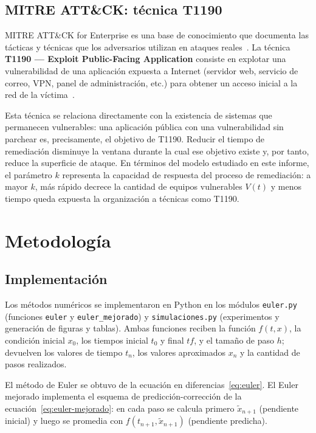 \documentclass[11pt,a4paper]{article}
\begin{document}
\subsection{MITRE ATT\&CK: técnica T1190}
\label{sec:marco-t1190}

MITRE ATT\&CK for Enterprise es una base de conocimiento que documenta las
tácticas y técnicas que los adversarios utilizan en ataques reales~\cite{mitre}.
La técnica \textbf{T1190 --- Exploit Public-Facing Application} consiste en
explotar una vulnerabilidad de una aplicación expuesta a Internet (servidor
web, servicio de correo, VPN, panel de administración, etc.) para obtener un
acceso inicial a la red de la víctima~\cite{t1190}.

Esta técnica se relaciona directamente con la existencia de sistemas que
permanecen vulnerables: una aplicación pública con una vulnerabilidad sin
parchear es, precisamente, el objetivo de T1190. Reducir el tiempo de
remediación disminuye la ventana durante la cual ese objetivo existe y, por
tanto, reduce la superficie de ataque. En términos del modelo estudiado en
este informe, el parámetro $k$ representa la capacidad de respuesta del
proceso de remediación: a mayor $k$, más rápido decrece la cantidad de
equipos vulnerables $V(t)$ y menos tiempo queda expuesta la organización a
técnicas como T1190.

\section{Metodología}
\label{sec:metodologia}

\subsection{Implementación}

Los métodos numéricos se implementaron en Python en los módulos
\texttt{euler.py} (funciones \texttt{euler} y \texttt{euler\_mejorado}) y
\texttt{simulaciones.py} (experimentos y generación de figuras y tablas).
Ambas funciones reciben la función $f(t,x)$, la condición inicial $x_0$, los
tiempos inicial $t_0$ y final $tf$, y el tamaño de paso $h$; devuelven los
valores de tiempo $t_n$, los valores aproximados $x_n$ y la cantidad de pasos
realizados.

El método de Euler se obtuvo de la ecuación en
diferencias~\eqref{eq:euler}. El Euler mejorado implementa el esquema de
predicción-corrección de la ecuación~\eqref{eq:euler-mejorado}: en cada paso
se calcula primero $\tilde{x}_{n+1}$ (pendiente inicial) y luego se promedia
con $f(t_{n+1}, \tilde{x}_{n+1})$ (pendiente predicha).
\end{document}
